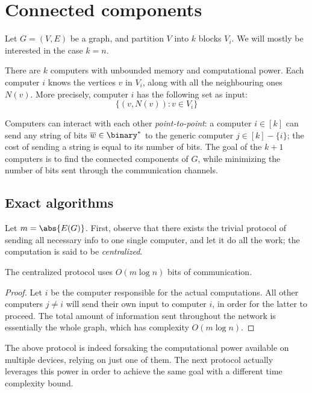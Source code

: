 \section{Connected components}

Let $G = (V, E)$ be a graph, and partition $V$ into $k$ blocks $V_i$. We will mostly be interested in the case $k = n$.

There are $k$ computers with unbounded memory and computational power. Each computer $i$ knows the vertices $v$ in $V_i$, along with all the neighbouring ones $N(v)$. More precisely, computer $i$ has the following set as input:
\[
    \{(v, N(v)) : v \in V_i\}
\]

Computers can interact with each other \emph{point-to-point}: a computer $i \in [k]$ can send any string of bits $\overline{w} \in \binary^*$ to the generic computer $j \in [k] - \{i\}$; the cost of sending a string is equal to its number of bits. The goal of the $k + 1$ computers is to find the connected components of $G$, while minimizing the number of bits sent through the communication channels. 

\subsection{Exact algorithms}

Let $m = \abs{E(G)}$. First, observe that there exists the trivial protocol of sending all necessary info to one single computer, and let it do all the work; the computation is said to be \emph{centralized}.
\begin{theorem}
    The centralized protocol uses $O(m \log n)$ bits of communication.
\end{theorem}

\begin{proof}
    Let $i$ be the computer responsible for the actual computations. All other computers $j \neq i$ will send their own input to computer $i$, in order for the latter to proceed. The total amount of information sent throughout the network is essentially the whole graph, which has complexity $O(m \log n)$.
\end{proof}

The above protocol is indeed forsaking the computational power available on multiple devices, relying on just one of them. The next protocol actually leverages this power in order to achieve the same goal with a different time complexity bound.

